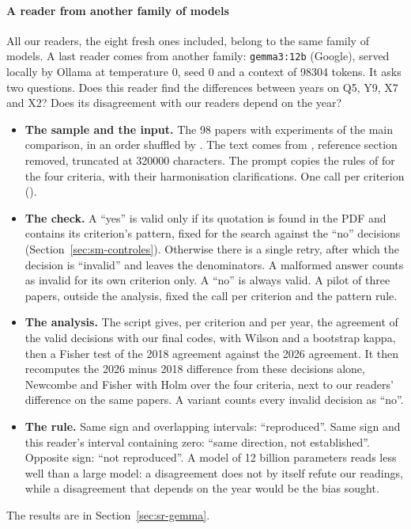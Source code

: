 \paragraph{A reader from another family of models}\label{sec:sm-gemma}
All our readers, the eight fresh ones included, belong to the same family of models. A last reader
comes from another family: \texttt{gemma3:12b} (Google), served locally by Ollama at temperature 0, seed 0 and a context of
\num{98304} tokens. It asks two questions. Does this reader find the differences between years on Q5,
Y9, X7 and X2? Does its disagreement with our readers depend on the year?
\begin{itemize}
  \item \textbf{The sample and the input.} The 98 papers with experiments of the main comparison, in
  an order shuffled by . The text comes from , reference
  section removed, truncated at \num{320000} characters. The prompt copies the rules of
   for the four criteria, with their harmonisation clarifications. One call per criterion ().
  \item \textbf{The check.} A \enquote{yes} is valid only if its quotation is found in the PDF and
  contains its criterion's pattern, fixed for the search against the \enquote{no} decisions
  (Section~\ref{sec:sm-controles}). Otherwise there is a single retry, after which the decision is \enquote{invalid} and leaves the
  denominators. A malformed answer counts as invalid for its own criterion only. A \enquote{no} is
  always valid. A pilot of three papers, outside the analysis, fixed the call per criterion and the
  pattern rule.
  \item \textbf{The analysis.} The script  gives, per criterion and per
  year, the agreement of the valid decisions with our final codes, with Wilson and a bootstrap kappa,
  then a Fisher test of the 2018 agreement against the 2026 agreement. It then recomputes the 2026
  minus 2018 difference from these decisions alone, Newcombe and Fisher with Holm over the four
  criteria, next to our readers' difference on the same papers. A variant counts every
  invalid decision as \enquote{no}.
  \item \textbf{The rule.} Same sign and overlapping intervals:
  \enquote{reproduced}. Same sign and this reader's interval containing zero: \enquote{same
  direction, not established}. Opposite sign: \enquote{not reproduced}. A model of 12 billion
  parameters reads less well than a large model: a disagreement does not by itself
  refute our readings, while a disagreement that depends on the year would be the bias sought.
\end{itemize}
The results are in Section~\ref{sec:sr-gemma}.

